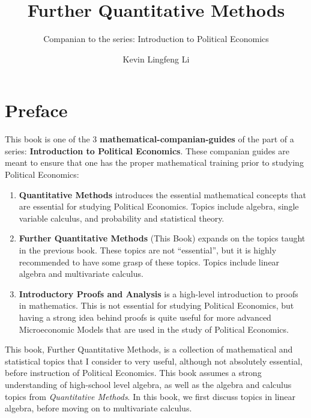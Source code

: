 \documentclass[
  a4paper,
]{report}
\title{Further Quantitative Methods}
\subtitle{Companian to the series: Introduction to Political Economics}
\author{Kevin Lingfeng Li}
\date{}
\providecommand{\tightlist}{%
  \setlength{\itemsep}{0pt}\setlength{\parskip}{0pt}}\usepackage{longtable,booktabs,array}
\renewcommand*\contentsname{Table of contents}
\newcommand\contentsname{Table of contents}
\begin{document}
\maketitle

\renewcommand*\contentsname{Table of contents}
{
\hypersetup{linkcolor=}
\setcounter{tocdepth}{1}
\tableofcontents
}

\chapter*{Preface}\label{preface}

This book is one of the 3 \textbf{mathematical-companian-guides} of the
part of a series: \textbf{Introduction to Political Economics}. These
companian guides are meant to ensure that one has the proper
mathematical training prior to studying Political Economics:

\begin{enumerate}
\def\labelenumi{\arabic{enumi}.}
\tightlist
\item
  \textbf{Quantitative Methods} introduces the essential mathematical
  concepts that are essential for studying Political Economics. Topics
  include algebra, single variable calculus, and probability and
  statistical theory.
\item
  \textbf{Further Quantitative Methods} (This Book) expands on the
  topics taught in the previous book. These topics are not
  ``essential'', but it is highly recommended to have some grasp of
  these topics. Topics include linear algebra and multivariate calculus.
\item
  \textbf{Introductory Proofs and Analysis} is a high-level introduction
  to proofs in mathematics. This is not essential for studying Political
  Economics, but having a strong idea behind proofs is quite useful for
  more advanced Microeconomic Models that are used in the study of
  Political Economics.
\end{enumerate}

This book, Further Quantitative Methods, is a collection of mathematical
and statistical topics that I consider to very useful, although not
absolutely essential, before instruction of Political Economics. This
book assumes a strong understanding of high-school level algebra, as
well as the algebra and calculus topics from \emph{Quantitative
Methods}. In this book, we first discuss topics in linear algebra,
before moving on to multivariate calculus.
\end{document}
